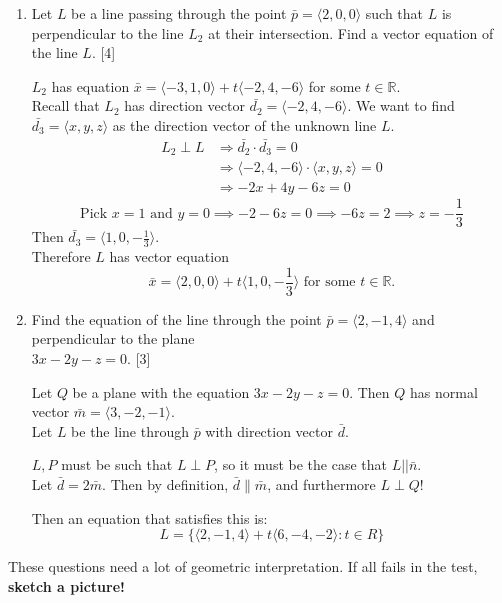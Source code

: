 \documentclass[11pt]{article}
\begin{document}
\begin{enumerate}[label=\alph*),resume=Last]
    \item Let \(L\) be a line passing through the point \(\bar{p} = \langle2,0,0\rangle\) such that \(L\) is
    perpendicular to the line \(L_2\) at their intersection. Find a vector equation of the line \(L\). \hfill [4]
    
    \color{blue}
    \(L_2\) has equation \(\bar{x} = \langle-3,1,0\rangle + t\langle-2,4,-6\rangle \) for some \(t \in \mathbb{R}\).\\
    Recall that \(L_2\) has direction vector \(\bar{d_2} = \langle-2,4,-6\rangle\). We want to find \(\bar{d_3} = \langle x,y,z\rangle\) as the direction vector 
    of the unknown line \(L\).
    \[
        \begin{aligned}
            L_2 \perp L &\Rightarrow \bar{d_2} \cdot \bar{d_3} = 0\\
            &\Rightarrow\langle-2,4,-6\rangle \cdot \langle x,y,z\rangle =0\\
            &\Rightarrow -2x+4y-6z = 0
        \end{aligned}
    \]
    \[
    \text{Pick } x = 1 \text{ and } y = 0 \implies -2-6z = 0 \implies -6z = 2 \implies z = -\frac{1}{3}
    \]
    Then \(\bar{d_3} = \langle 1,0, -\frac{1}{3} \rangle\).\\
    Therefore \(L\) has vector equation
    \[
    \bar{x} = \langle 2,0,0 \rangle + t\langle 1,0, -\frac{1}{3} \rangle \text{ for some } t \in \mathbb{R}.\]
    \color{black}
    \item Find the equation of the line through the point \(\bar{p} = \langle2,-1,4\rangle\) and perpendicular to the
    plane\\ \(3x-2y-z=0\). \hfill [3]

    \color{blue}
    Let \(Q\) be a plane with the equation \(3x-2y-z=0\). Then \(Q\) has normal vector \(\bar{m} = \langle 3,-2,-1\rangle\).\\
    Let \(L\) be the line through \(\bar{p}\) with direction vector \(\bar{d}\).

    \vspace{1em}

    \(L, P\) must be such that \(L \perp P\), so it must be the case that \(L || \bar{n}\).\\ Let \(\bar{d} = 2\bar{m}\). Then by definition,
    \(\bar{d}\parallel\bar{m}\), and furthermore \(L\perp Q\)!

    Then an equation that satisfies this is:
    \[
    L = \{\langle 2,-1,4\rangle + t\langle 6,-4,-2\rangle : t \in R\}
    \]
\end{enumerate}

\begin{remarkbox}
    These questions need a lot of geometric interpretation. If all fails in the test, \textbf{sketch a picture!}
\end{remarkbox}
\end{document}
